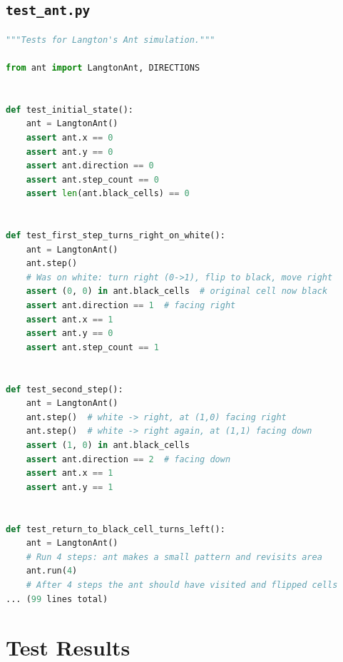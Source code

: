 \documentclass[11pt,a4paper]{article}
\begin{document}
\subsection*{\texttt{test\_ant.py}}
\begin{lstlisting}[language=Python]
"""Tests for Langton's Ant simulation."""

from ant import LangtonAnt, DIRECTIONS


def test_initial_state():
    ant = LangtonAnt()
    assert ant.x == 0
    assert ant.y == 0
    assert ant.direction == 0
    assert ant.step_count == 0
    assert len(ant.black_cells) == 0


def test_first_step_turns_right_on_white():
    ant = LangtonAnt()
    ant.step()
    # Was on white: turn right (0->1), flip to black, move right
    assert (0, 0) in ant.black_cells  # original cell now black
    assert ant.direction == 1  # facing right
    assert ant.x == 1
    assert ant.y == 0
    assert ant.step_count == 1


def test_second_step():
    ant = LangtonAnt()
    ant.step()  # white -> right, at (1,0) facing right
    ant.step()  # white -> right again, at (1,1) facing down
    assert (1, 0) in ant.black_cells
    assert ant.direction == 2  # facing down
    assert ant.x == 1
    assert ant.y == 1


def test_return_to_black_cell_turns_left():
    ant = LangtonAnt()
    # Run 4 steps: ant makes a small pattern and revisits area
    ant.run(4)
    # After 4 steps the ant should have visited and flipped cells
... (99 lines total)
\end{lstlisting}

\section{Test Results}
\end{document}
